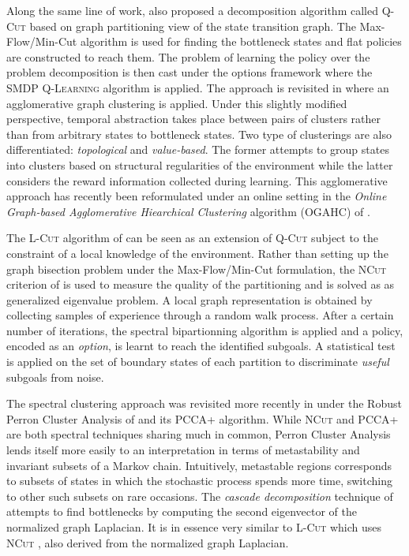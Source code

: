 Along the same line of work, \cite{Menache2002} also proposed a decomposition algorithm called \textsc{Q-Cut} based on graph partitioning view of the state transition graph. The Max-Flow/Min-Cut algorithm is used for finding the bottleneck states and flat policies are constructed to reach them. The problem of learning the policy over the problem decomposition is then cast under the options framework \cite{Sutton1999} where the \textsc{SMDP Q-Learning} algorithm is applied. The approach is revisited in \cite{Mannor2004} where an agglomerative graph clustering is applied. Under this slightly modified perspective, temporal abstraction takes place between pairs of clusters rather than from arbitrary states to bottleneck states. Two type of clusterings are also differentiated: \textit{topological} and \textit{value-based}. The former attempts to group states into clusters based on structural regularities of the environment while the latter considers the reward information collected during learning.
This agglomerative approach has recently been reformulated under an online setting in the \textit{Online Graph-based Agglomerative Hiearchical Clustering} algorithm (\textsc{OGAHC}) of \cite{Metzen2012}.

The \textsc{L-Cut} algorithm of \cite{Simsek2005} can be seen as an extension of \textsc{Q-Cut} subject to the constraint of a local knowledge of the environment. Rather than setting up the graph bisection problem under the Max-Flow/Min-Cut formulation, the \textsc{NCut} criterion of \cite{ShiMalik2000} is used to measure the quality of the partitioning and is solved as as generalized eigenvalue problem. A local graph representation is obtained by collecting samples of experience through a random walk process. After a certain number of iterations, the spectral bipartionning algorithm is applied and a policy, encoded as an \textit{option}, is learnt to reach the identified subgoals. A statistical test is applied on the set of boundary states of each partition to discriminate \textit{useful} subgoals from noise.

The spectral clustering approach was revisited more recently in \cite{Mathew2012} under the Robust Perron Cluster Analysis of \cite{Weber2004} and its \textsc{PCCA+} algorithm. While \textsc{NCut} and \textsc{PCCA+} are both spectral techniques sharing much in common,  Perron Cluster Analysis lends itself more easily to an interpretation in terms of metastability and invariant subsets of a Markov chain. Intuitively, metastable regions corresponds to subsets of states in which the stochastic process spends more time, switching to other such subsets on rare occasions. The \textit{cascade decomposition} technique of \cite{Chiu2010} attempts to find bottlenecks by computing the second eigenvector of the normalized graph Laplacian. It is in essence very similar to \textsc{L-Cut} which uses \textsc{NCut} \cite{ShiMalik200}, also derived from the normalized graph Laplacian. 

